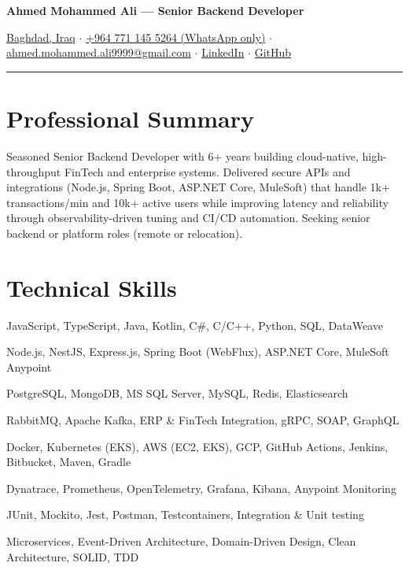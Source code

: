 \documentclass[10pt, a4paper]{article}
\begin{document}
\begin{center}
    \textbf{\Large Ahmed Mohammed Ali — Senior Backend Developer}
\end{center}

\vspace{-1.5mm}
\begin{center}
    \small
    \href{https://maps.app.goo.gl/YourLocation}{Baghdad, Iraq}
    $\cdot$ \href{https://wa.me/9647711455264}{+964 771 145 5264 (WhatsApp only)}
    $\cdot$ \href{mailto:ahmed.mohammed.ali9999@gmail.com}{ahmed.mohammed.ali9999@gmail.com}
    $\cdot$ \href{https://linkedin.com/in/deadboyccc}{LinkedIn}
    $\cdot$ \href{https://github.com/deadboyccc}{GitHub}
\end{center}
\hrule %

\section*{Professional Summary}
Seasoned Senior Backend Developer with 6+ years building cloud-native, high-throughput FinTech and enterprise systems. Delivered secure APIs and integrations (Node.js, Spring Boot, ASP.NET Core, MuleSoft) that handle 1k+ transactions/min and 10k+ active users while improving latency and reliability through observability-driven tuning and CI/CD automation. Seeking senior backend or platform roles (remote or relocation).

\section*{Technical Skills}
\begin{description}[font=\textbf, align=left, labelwidth=2.5cm, leftmargin=\dimexpr2.5cm+\labelsep\relax]
    \item[Languages:] JavaScript, TypeScript, Java, Kotlin, C\#, C/C++, Python, SQL, DataWeave
    \item[Frameworks \& Platforms:] Node.js, NestJS, Express.js, Spring Boot (WebFlux), ASP.NET Core, MuleSoft Anypoint
    \item[Databases \& Storage:] PostgreSQL, MongoDB, MS SQL Server, MySQL, Redis, Elasticsearch
    \item[Messaging \& Integration:] RabbitMQ, Apache Kafka, ERP \& FinTech Integration, gRPC, SOAP, GraphQL
    \item[Cloud \& DevOps:] Docker, Kubernetes (EKS), AWS (EC2, EKS), GCP, GitHub Actions, Jenkins, Bitbucket, Maven, Gradle
    \item[Observability \& Monitoring:] Dynatrace, Prometheus, OpenTelemetry, Grafana, Kibana, Anypoint Monitoring
    \item[Testing \& Quality:] JUnit, Mockito, Jest, Postman, Testcontainers, Integration \& Unit testing
    \item[Architecture \& Principles:] Microservices, Event-Driven Architecture, Domain-Driven Design, Clean Architecture, SOLID, TDD
\end{description}
\end{document}
